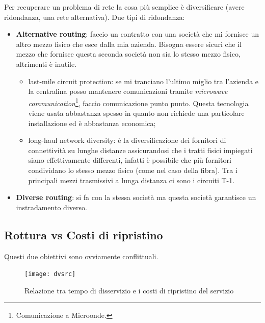 Per recuperare un problema di rete la cosa più semplice è diversificare (avere
ridondanza, una rete alternativa). Due tipi di ridondanza:
\begin{itemize}
  \item \textbf{Alternative routing}: faccio un contratto con una società che
  mi fornisce un altro mezzo fisico che esce dalla mia azienda. Bisogna essere
  sicuri che il mezzo che fornisce questa seconda società non sia lo stesso
  mezzo fisico, altrimenti è inutile.
  \begin{itemize}
    \item last-mile circuit protection: se mi tranciano l'ultimo miglio tra
    l'azienda e la centralina posso mantenere comunicazioni tramite
    \textit{microwave communication}\footnote{Comunicazione a Microonde.},
    faccio comunicazione punto punto. Questa tecnologia viene usata abbastanza 
    spesso in quanto non richiede una particolare installazione ed è abbastanza 
    economica;
    \item long-haul network diversity: è la diversificazione dei fornitori di
    connettività su lunghe distanze assicurandosi che i tratti fisici impiegati 
    siano effettivamente differenti, infatti è possibile che più fornitori 
    condividano lo stesso mezzo fisico (come nel caso della fibra). Tra i 
    principali mezzi trasmissivi a lunga distanza ci sono i circuiti T-1.
  \end{itemize}
  \item \textbf{Diverse routing}: si fa con la stessa società ma questa società
  garantisce un instradamento diverso.
\end{itemize}

\subsection{Rottura vs Costi di ripristino}

Questi due obiettivi sono ovviamente conflittuali.

\begin{figure}[H]
  \centering
  \texttt{[image: dvsrc]}
  \caption{Relazione tra tempo di disservizio e i costi di ripristino del
  servizio}
\end{figure}

